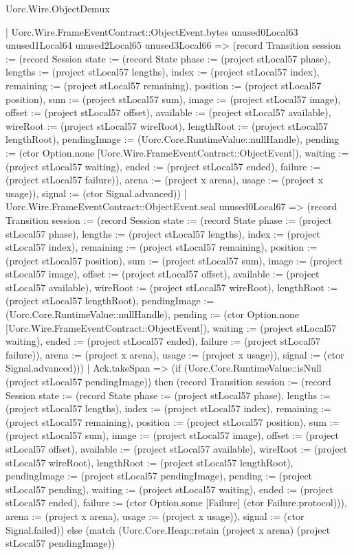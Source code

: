 \begin{lexlean}{Uorc.Wire.ObjectDemux}
\begin{semanticmodule}
{          | Uorc.Wire.FrameEventContract::ObjectEvent.bytes unused0Local63 unused1Local64 unused2Local65 unused3Local66 => (record Transition {session := (record Session {state := (record State {phase := (project stLocal57 phase), lengths := (project stLocal57 lengths), index := (project stLocal57 index), remaining := (project stLocal57 remaining), position := (project stLocal57 position), sum := (project stLocal57 sum), image := (project stLocal57 image), offset := (project stLocal57 offset), available := (project stLocal57 available), wireRoot := (project stLocal57 wireRoot), lengthRoot := (project stLocal57 lengthRoot), pendingImage := (Uorc.Core.RuntimeValue::nullHandle), pending := (ctor Option.none [Uorc.Wire.FrameEventContract::ObjectEvent]), waiting := (project stLocal57 waiting), ended := (project stLocal57 ended), failure := (project stLocal57 failure)}), arena := (project x arena), usage := (project x usage)}), signal := (ctor Signal.advanced)})
          | Uorc.Wire.FrameEventContract::ObjectEvent.seal unused0Local67 => (record Transition {session := (record Session {state := (record State {phase := (project stLocal57 phase), lengths := (project stLocal57 lengths), index := (project stLocal57 index), remaining := (project stLocal57 remaining), position := (project stLocal57 position), sum := (project stLocal57 sum), image := (project stLocal57 image), offset := (project stLocal57 offset), available := (project stLocal57 available), wireRoot := (project stLocal57 wireRoot), lengthRoot := (project stLocal57 lengthRoot), pendingImage := (Uorc.Core.RuntimeValue::nullHandle), pending := (ctor Option.none [Uorc.Wire.FrameEventContract::ObjectEvent]), waiting := (project stLocal57 waiting), ended := (project stLocal57 ended), failure := (project stLocal57 failure)}), arena := (project x arena), usage := (project x usage)}), signal := (ctor Signal.advanced)}))
        | Ack.takeSpan => (if (Uorc.Core.RuntimeValue::isNull (project stLocal57 pendingImage)) then (record Transition {session := (record Session {state := (record State {phase := (project stLocal57 phase), lengths := (project stLocal57 lengths), index := (project stLocal57 index), remaining := (project stLocal57 remaining), position := (project stLocal57 position), sum := (project stLocal57 sum), image := (project stLocal57 image), offset := (project stLocal57 offset), available := (project stLocal57 available), wireRoot := (project stLocal57 wireRoot), lengthRoot := (project stLocal57 lengthRoot), pendingImage := (project stLocal57 pendingImage), pending := (project stLocal57 pending), waiting := (project stLocal57 waiting), ended := (project stLocal57 ended), failure := (ctor Option.some [Failure] (ctor Failure.protocol))}), arena := (project x arena), usage := (project x usage)}), signal := (ctor Signal.failed)}) else (match (Uorc.Core.Heap::retain (project x arena) (project stLocal57 pendingImage))
}
\end{semanticmodule}
\end{lexlean}
